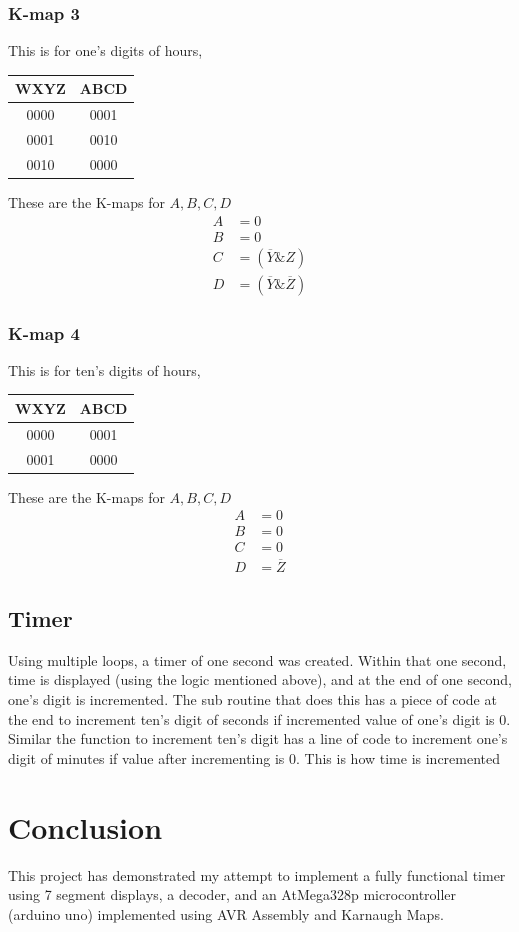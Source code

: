 \documentclass[a4paper,12pt]{article}
\begin{document}
\subsubsection*{K-map 3}
This is for one's digits of hours, \newline \newline
\begin{tabular}{|c|c|}
\hline
WXYZ & ABCD \\
\hline
0000 & 0001 \\
0001 & 0010 \\
0010 & 0000 \\
\hline
\end{tabular}
\newline
\newline These are the K-maps for $A, B, C, D$
\begin{align*}
A &= 0 \\
B &= 0 \\
C &= (\overline{Y} \& Z) \\
D &= (\overline{Y} \& \overline{Z})
\end{align*}
\subsubsection*{K-map 4}
This is for ten's digits of hours, \newline \newline
\begin{tabular}{|c|c|}
\hline
WXYZ & ABCD \\
\hline
0000 & 0001 \\
0001 & 0000 \\
\hline
\end{tabular}
\newline
\newline These are the K-maps for $A, B, C, D$
\begin{align*}
A &= 0 \\
B &= 0 \\
C &= 0 \\
D &= \overline{Z}
\end{align*}
\subsection*{Timer}
Using multiple loops, a timer of one second was created. Within that one second, time is displayed (using the logic mentioned above), and at the end of one second, one's digit is incremented. The sub routine that does this has a piece of code at the end to increment ten's digit of seconds if incremented value of one's digit is 0. Similar the function to increment ten's digit has a line of code to increment one's digit of minutes if value after incrementing is 0. This is how time is incremented

\section*{Conclusion}
This project has demonstrated my attempt to implement a fully functional timer using 7 segment displays, a decoder, and an AtMega328p microcontroller (arduino uno) implemented using AVR Assembly and Karnaugh Maps. 
\end{document}

